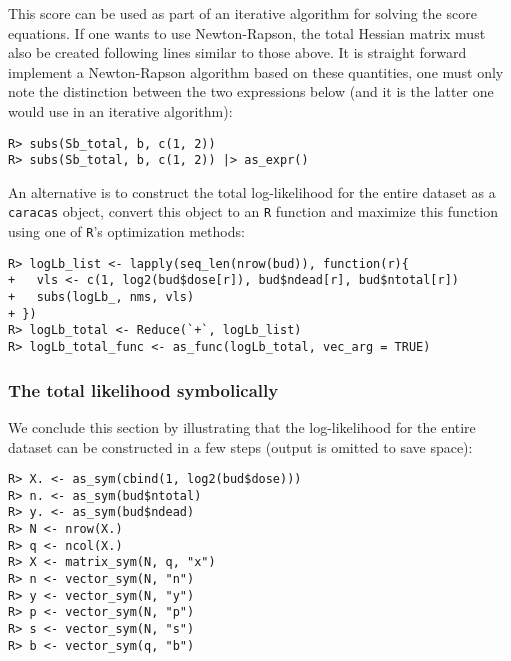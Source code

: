 This score can be used as part of an iterative algorithm for solving the score equations.
If one wants to use Newton-Rapson, the total Hessian matrix must also be created
following lines similar to those above.
It is straight forward implement a Newton-Rapson algorithm based on these
quantities, one must only note the distinction between the two expressions
below (and it is the latter one would use in an iterative algorithm):

\begin{verbatim}
R> subs(Sb_total, b, c(1, 2))
R> subs(Sb_total, b, c(1, 2)) |> as_expr()
\end{verbatim}

An alternative is to construct the total log-likelihood
for the entire dataset as a \texttt{caracas} object, convert this
object to an \texttt{R} function and maximize this
function using one of \texttt{R}'s optimization methods:

\begin{verbatim}
R> logLb_list <- lapply(seq_len(nrow(bud)), function(r){
+   vls <- c(1, log2(bud$dose[r]), bud$ndead[r], bud$ntotal[r])
+   subs(logLb_, nms, vls) 
+ })
R> logLb_total <- Reduce(`+`, logLb_list)
R> logLb_total_func <- as_func(logLb_total, vec_arg = TRUE)
\end{verbatim}

\hypertarget{the-total-likelihood-symbolically}{%
\subsubsection{The total likelihood symbolically}\label{the-total-likelihood-symbolically}}

We conclude this section by illustrating that the log-likelihood for the entire dataset
can be constructed in a few steps (output is omitted to save space):

\begin{verbatim}
R> X. <- as_sym(cbind(1, log2(bud$dose)))
R> n. <- as_sym(bud$ntotal)
R> y. <- as_sym(bud$ndead)
R> N <- nrow(X.)
R> q <- ncol(X.)
R> X <- matrix_sym(N, q, "x")
R> n <- vector_sym(N, "n")
R> y <- vector_sym(N, "y")
R> p <- vector_sym(N, "p")
R> s <- vector_sym(N, "s")
R> b <- vector_sym(q, "b")
\end{verbatim}

